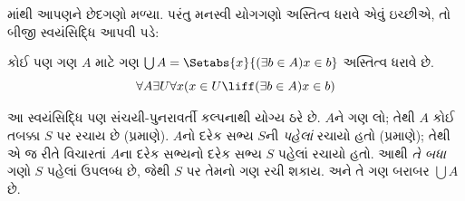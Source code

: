 \documentclass[../../../include/open-logic-section]{subfiles}
\begin{document}

માંથી આપણને છેદગણો
મળ્યા. પરંતુ મનસ્વી યોગગણો અસ્તિત્વ ધરાવે એવું ઇચ્છીએ, તો
બીજી સ્વયંસિદ્ધિ આપવી પડે:

\begin{axiom}[યોગગણ]
કોઈ પણ ગણ $A$ માટે ગણ $\bigcup A =
\Setabs{x}{(\exists b \in A) x \in b}$ અસ્તિત્વ ધરાવે છે.
\[
\forall A \exists U \forall x(x \in U \liff (\exists b \in A)x \in b)
\]
\end{axiom}

આ સ્વયંસિદ્ધિ પણ સંચયી-પુનરાવર્તી કલ્પનાથી યોગ્ય ઠરે છે.
$A$ને ગણ લો; તેથી $A$ કોઈ તબક્કા $S$ પર રચાય છે
(\stageshier પ્રમાણે). $A$નો દરેક સભ્ય $S$ની \emph{પહેલાં}
રચાયો હતો (\stagesacc પ્રમાણે); તેથી એ જ રીતે વિચારતાં
$A$ના દરેક સભ્યનો દરેક સભ્ય $S$ પહેલાં રચાયો હતો.
આથી \emph{તે બધા} ગણો $S$ પહેલાં ઉપલબ્ધ છે, જેથી
$S$ પર તેમનો ગણ રચી શકાય. અને તે ગણ બરાબર $\bigcup A$ છે.
\end{document}

